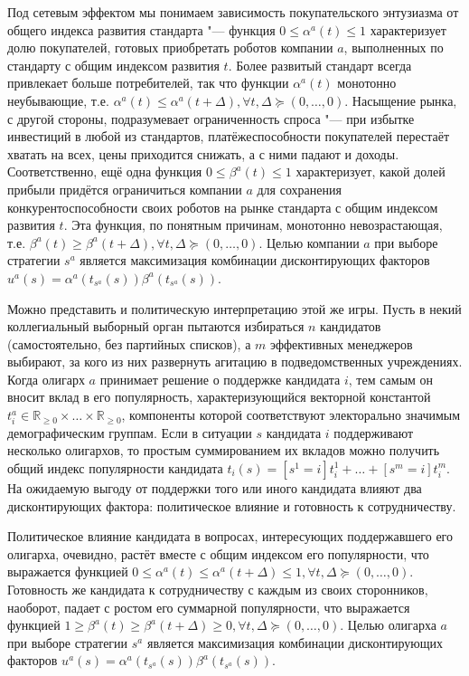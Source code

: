 Под сетевым эффектом мы понимаем зависимость покупательского энтузиазма от общего индекса развития стандарта "--- функция $0 \le \alpha^a(t) \le 1$ характеризует долю покупателей, готовых приобретать роботов компании $a$, выполненных по стандарту с общим индексом развития $t$. Более развитый стандарт всегда привлекает больше потребителей, так что функции $\alpha^a(t)$ монотонно неубывающие, т.е. $\alpha^a(t) \le \alpha^a(t + \Delta), \forall t, \Delta \succeq (0, \ldots, 0)$. Насыщение рынка, с другой стороны, подразумевает ограниченность спроса "--- при избытке инвестиций в любой из стандартов, платёжеспособности покупателей перестаёт хватать на всех, цены приходится снижать, а с ними падают и доходы. Соответственно, ещё одна функция $0 \le \beta^a(t) \le 1$ характеризует, какой долей прибыли придётся ограничиться компании $a$ для сохранения конкурентоспособности своих роботов на рынке стандарта с общим индексом развития $t$. Эта функция, по понятным причинам, монотонно невозрастающая, т.е. $\beta^a(t) \ge \beta^a(t + \Delta), \forall t, \Delta \succeq (0, \ldots, 0)$. Целью компании $a$ при выборе стратегии $s^a$ является максимизация комбинации дисконтирующих факторов $u^a(s) = \alpha^a(t_{s^a}(s)) \beta^a(t_{s^a}(s))$.

Можно представить и политическую интерпретацию этой же игры. Пусть в некий коллегиальный выборный орган пытаются избираться $n$ кандидатов (самостоятельно, без партийных списков), а $m$ эффективных менеджеров выбирают, за кого из них развернуть агитацию в подведомственных учреждениях. Когда олигарх $a$ принимает решение о поддержке кандидата $i$, тем самым он вносит вклад в его популярность, характеризующийся векторной константой $t_i^a \in \mathbb{R}_{\ge 0} \times \ldots \times \mathbb{R}_{\ge 0}$, компоненты которой соответствуют электорально значимым демографическим группам. Если в ситуации $s$ кандидата $i$ поддерживают несколько олигархов, то простым суммированием их вкладов можно получить общий индекс популярности кандидата $t_i(s) = [s^1 = i] t_i^1 + \ldots + [s^m = i] t_i^m$. На ожидаемую выгоду от поддержки того или иного кандидата влияют два дисконтирующих фактора: политическое влияние и готовность к сотрудничеству.

Политическое влияние кандидата в вопросах, интересующих поддержавшего его олигарха, очевидно, растёт вместе с общим индексом его популярности, что выражается функцией $0 \le \alpha^a(t) \le \alpha^a(t + \Delta) \le 1, \forall t, \Delta \succeq (0, \ldots, 0)$. Готовность же кандидата к сотрудничеству с каждым из своих сторонников, наоборот, падает с ростом его суммарной популярности, что выражается функцией $1 \ge \beta^a(t) \ge \beta^a(t + \Delta) \ge 0, \forall t, \Delta \succeq (0, \ldots, 0)$. Целью олигарха $a$ при выборе стратегии $s^a$ является максимизация комбинации дисконтирующих факторов $u^a(s) = \alpha^a(t_{s^a}(s)) \beta^a(t_{s^a}(s))$.

